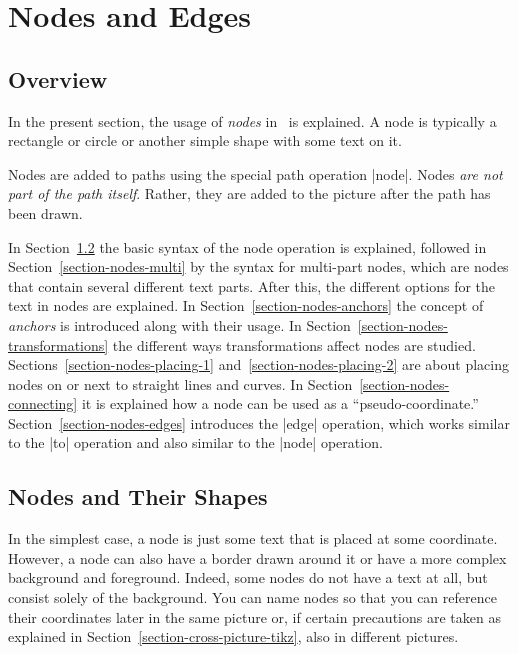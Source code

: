 %
%
%

\section{Nodes and Edges}

\label{section-nodes}

\subsection{Overview}

In the present section, the usage of \emph{nodes} in
\tikzname\ is explained. A node is typically a rectangle or circle or
another simple shape with some text on it.

Nodes are added to paths using the special path
operation |node|. Nodes \emph{are not part of the path
  itself}. Rather, they are added to the picture after the path has
been drawn.

In Section~\ref{section-nodes-basic} the basic syntax of the node
operation is explained, followed in Section~\ref{section-nodes-multi}
by the syntax for multi-part nodes, which are nodes that contain
several different text parts. After this, the different options for
the text in nodes are explained. In
Section~\ref{section-nodes-anchors} the concept of \emph{anchors} is
introduced along with their usage. In
Section~\ref{section-nodes-transformations} the different ways
transformations affect nodes are
studied. Sections~\ref{section-nodes-placing-1}
and~\ref{section-nodes-placing-2} are about placing nodes on or next
to straight lines and curves. In
Section~\ref{section-nodes-connecting} it is explained how a node can
be used as a ``pseudo-coordinate.'' Section~\ref{section-nodes-edges}
introduces the |edge| operation, which
works similar to the |to| operation and also similar to the |node|
operation.


\subsection{Nodes and Their Shapes}

\label{section-nodes-basic}

In the simplest case, a node is just some text that is
placed at some coordinate. However, a node can also have a border
drawn around it or have a more complex background and
foreground. Indeed, some nodes do not have a text at all, but consist
solely of the background. You can name nodes so that you can reference
their coordinates later in the same picture or, if certain precautions
are taken as explained in Section~\ref{section-cross-picture-tikz},
also in different pictures.

